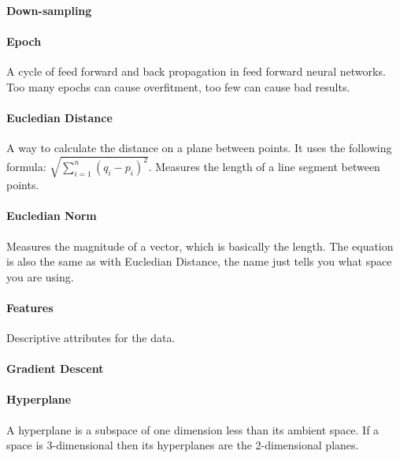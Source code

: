 \paragraph{Down-sampling}

\paragraph{Epoch} A cycle of feed forward and back propagation in feed forward neural networks. Too many epochs can cause overfitment, too few can cause bad results.

\paragraph{Eucledian Distance}
A way to calculate the distance on a plane between points. It uses the following formula: $\sqrt{\sum\limits_{i=1}^n (q_{i} - p_{i})^2}$. Measures the length of a line segment between points.

\paragraph{Eucledian Norm}
Measures the magnitude of a vector, which is basically the length. The equation is also the same as with Eucledian Distance, the name just tells you what space you are using.

\paragraph{Features} 
Descriptive attributes for the data.

\paragraph{Gradient Descent}

\paragraph{Hyperplane}
A hyperplane is a subspace of one dimension less than its ambient space. If a space is 3-dimensional then its hyperplanes are the 2-dimensional planes.


